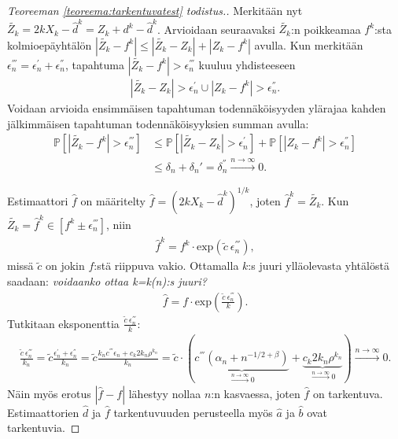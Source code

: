 \documentclass[finnish,12pt,a4paper,pdftex,sci,utf8]{aaltothesis}
\begin{document}
\begin{proof}[Teoreeman \ref{teoreema:tarkentuvatest} todistus.]
	Merkitään nyt $\tilde{Z_k} = 2kX_k - \hat{d}^k = Z_k + d^k - \hat{d}^k$. Arvioidaan seuraavaksi $\tilde{Z_k}$:n poikkeamaa $f^k$:sta kolmioepäyhtälön $|\tilde{Z_k} - f^k| \leq |\tilde{Z_k} - Z_k| + |Z_k - f^k|$ avulla. Kun merkitään $\epsilon_{n}^{'''} = \epsilon_{n}^{'} + \epsilon_{n}^{''}$, tapahtuma $|\tilde{Z_k} - f^k| > \epsilon_{n}^{'''}$ kuuluu yhdisteeseen 
	\begin{align*}
		|\tilde{Z_k} - Z_k| > \epsilon_{n}^{'} \cup |Z_k - f^k| > \epsilon_{n}^{''}.
	\end{align*}
	Voidaan arvioida ensimmäisen tapahtuman todennäköisyyden ylärajaa kahden jälkimmäisen tapahtuman todennäköisyyksien summan avulla:
	\begin{align*}
		\mathbb{P}[|\tilde{Z_k} - f^k| > \epsilon_{n}^{'''}] &\leq \mathbb{P}[|\tilde{Z_k} - Z_k| > \epsilon_{n}^{'}] + \mathbb{P}[|Z_k - f^k| > \epsilon_{n}^{''}] \\
		&\leq \delta_n + \delta_n' = \delta_n^{''} \xrightarrow{n \rightarrow \infty} 0.
	\end{align*}

	Estimaattori $\hat{f}$ on määritelty $\hat{f} = (2kX_k - \hat{d}^k)^{1/k}$, joten $\hat{f}^k = \tilde{Z_k}$. Kun \\ $\tilde{Z_k} = \hat{f}^k \in [f^k \pm \epsilon_{n}^{'''}]$, niin 
	\begin{align*}
			\hat{f}^k = f^k \cdot \text{exp}(\tilde{c} \ \epsilon_{n}^{'''}),
		\end{align*}
missä $\tilde{c}$ on jokin $f$:stä riippuva vakio. Ottamalla $k$:s juuri ylläolevasta yhtälöstä saadaan: \textit{voidaanko ottaa k=k(n):s juuri?}
	\begin{align*}
		\hat{f} = f \cdot \text{exp}(\frac{\tilde{c} \ \epsilon_{n}^{'''}}{k}).
	\end{align*}
	Tutkitaan eksponenttia $\frac{\tilde{c} \ \epsilon_{n}^{'''}}{k}$:
	\begin{align*}
		\frac{\tilde{c} \ \epsilon_{n}^{'''}}{k_n} = \tilde{c} \frac{\epsilon_{n}^{'} + \epsilon_{n}^{''}}{k_n} = \tilde{c} \frac{k_n c^{'''} \epsilon_{n}^{} + c_k 2k_n \rho^{k_n}}{k_n} = \tilde{c} \cdot (\underbrace{c^{'''} (\alpha_n + n^{-1/2 + \beta})}_{\xrightarrow{n \rightarrow \infty} 0} + \underbrace{c_k 2k_n \rho^{k_n}}_{\xrightarrow{n \rightarrow \infty} 0}) \xrightarrow{n \rightarrow \infty} 0.
	\end{align*}
	Näin myös erotus $|\hat{f} - f| $ lähestyy nollaa $n$:n kasvaessa, joten $\hat{f}$ on tarkentuva. Estimaattorien $\hat{d}$ ja $\hat{f}$ tarkentuvuuden perusteella myös $\hat{a}$ ja $\hat{b}$ ovat tarkentuvia.
\end{proof}
\end{document}
